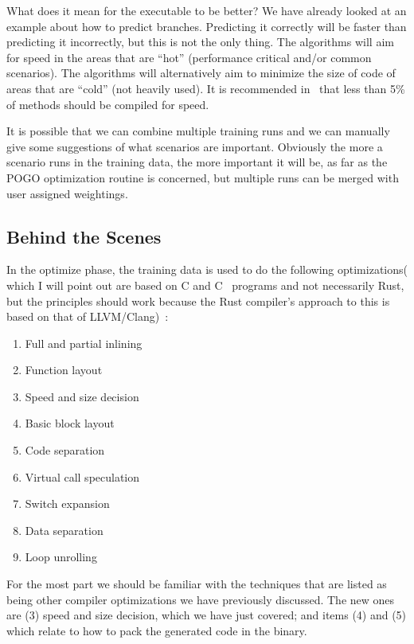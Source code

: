 \documentclass[a4paper]{report}
\newcommand{\CPP}{C\nolinebreak\hspace{-.05em}\raisebox{.4ex}{\tiny\bf +}\nolinebreak\hspace{-.10em}\raisebox{.4ex}{\tiny\bf +}}
\def\CPP{{C\nolinebreak[4]\hspace{-.05em}\raisebox{.4ex}{\tiny\bf ++}}}
\begin{document}
What does it mean for the executable to be better? We have already looked at an example about how to predict branches. Predicting it correctly will be faster than predicting it incorrectly, but this is not the only thing.  The algorithms will aim for speed in the areas that are ``hot'' (performance critical and/or common scenarios). The algorithms will alternatively aim to minimize the size of code of areas that are ``cold'' (not heavily used). It is recommended in~\cite{pogo} that less than 5\% of methods should be compiled for speed.

It is possible that we can combine multiple training runs and we can manually give some suggestions of what scenarios are important. Obviously the more a scenario runs in the training data, the more important it will be, as far as the POGO optimization routine is concerned, but multiple runs can be merged with user assigned weightings.

\subsection*{Behind the Scenes}

In the optimize phase, the training data is used to do the following optimizations( which I will point out are based on C and \CPP~ programs and not necessarily Rust, but the principles should work because the Rust compiler's approach to this is based on that of LLVM/Clang)~\cite{pogo2}:

\begin{multicols}{2}
\begin{enumerate}
\item Full and partial inlining
\item Function layout
\item Speed and size decision
\item Basic block layout 
\item Code separation
\item Virtual call speculation
\item Switch expansion
\item Data separation
\item Loop unrolling
\end{enumerate}
\end{multicols}

For the most part we should be familiar with the techniques that are listed as being other compiler optimizations we have previously discussed. The new ones are (3) speed and size decision, which we have just covered; and items (4) and (5) which relate to how to pack the generated code in the binary.
\end{document}
